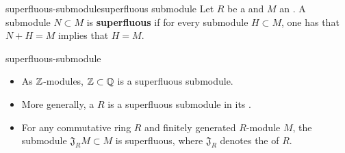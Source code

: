 \begin{topic}{superfluous-submodule}{superfluous submodule}
    Let $R$ be a  and $M$ an . A submodule $N \subset M$ is \textbf{superfluous} if for every submodule $H \subset M$, one has that $N + H = M$ implies that $H = M$.
\end{topic}

\begin{example}{superfluous-submodule}
    \begin{itemize}
        \item As $\mathbb{Z}$-modules, $\mathbb{Z} \subset \mathbb{Q}$ is a superfluous submodule.
        \item More generally, a  $R$ is a superfluous submodule in its .
        \item For any commutative ring $R$ and finitely generated $R$-module $M$, the submodule $\mathfrak{J}_R M \subset M$ is superfluous, where $\mathfrak{J}_R$ denotes the  of $R$.
    \end{itemize}
\end{example}
